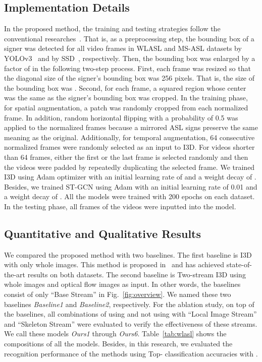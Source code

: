 \documentclass[journal]{IEEEtran}
\begin{document}
\subsection{Implementation Details}
In the proposed method, the training and testing strategies follow the conventional researches~\cite{li2020word, vaezi2019ms-asl}.
That is, as a preprocessing step, the bounding box of a signer was detected for all video frames in WLASL and MS-ASL datasets by YOLOv3~\cite{redmon2018yolov3} and by SSD~\cite{liu2016ssd}, respectively.
Then, the bounding box was enlarged by a factor of  in the following two-step process.
First, each frame was resized so that the diagonal size of the signer's bounding box was 256 pixels.
That is, the size of the bounding box was .
Second, for each frame, a  squared region whose center was the same as the signer's bounding box was cropped.
In the training phase, for spatial augmentation, a  patch was randomly cropped from each normalized frame.
In addition, random horizontal flipping with a probability of 0.5 was applied to the normalized frames because a mirrored ASL signs preserve the same meaning as the original.
Additionally, for temporal augmentation, 64 consecutive normalized frames were randomly selected as an input to I3D.
For videos shorter than 64 frames, either the first or the last frame is selected randomly and then 
the videos were padded by repeatedly duplicating the selected frame. 
We trained I3D using Adam optimizer with an initial learning rate of  and a weight decay of . 
Besides, we trained ST-GCN using Adam with an initial learning rate of 0.01  and a weight decay of .
All the models were trained with 200 epochs on each dataset.
In the testing phase, all frames of the videos were inputted into the model.



\subsection{Quantitative and Qualitative Results}
We compared the proposed method with two baselines.
The first baseline is I3D with only whole images.
This method is proposed in~\cite{li2020word, vaezi2019ms-asl} and has achieved state-of-the-art results on both datasets.
The second baseline is Two-stream I3D using whole images and optical flow images as input.
In other words, the baselines consist of only ``Base Stream'' in Fig.~\ref{fig:overview}.
We named these two baselines \textit{Baseline1} and \textit{Baseline2}, respectively.
For the ablation study, on top of the baselines, all combinations of using and not using with ``Local Image Stream'' and ``Skeleton Stream'' were evaluated to verify the effectiveness of these streams.
We call these models \textit{Ours1} through \textit{Ours6}.
Table~\ref{tab:wlasl} shows the compositions of all the models.
Besides, in this research, we evaluated the recognition performance of the methods using Top- classification accuracies with .
\end{document}
